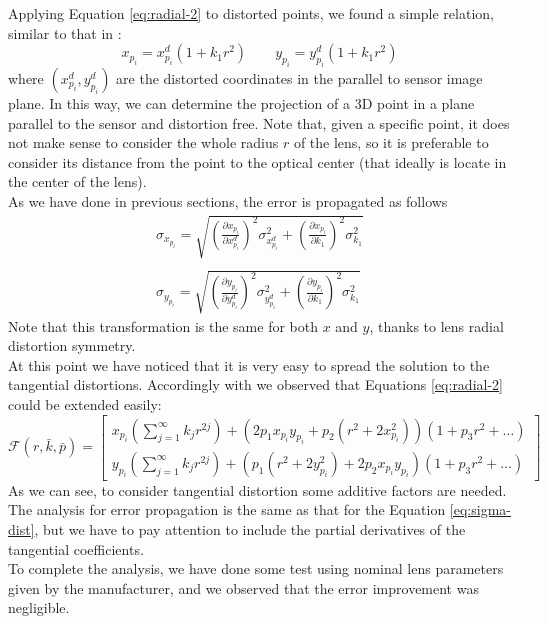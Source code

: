 Applying Equation \ref{eq:radial-2} to distorted points, we found a simple relation, similar to that in \cite{TsaiTvLenses}:
  \begin{equation}
    \label{eq:dist-coords}
    x_{p_i} = x_{p_i}^{d} \left( 1 + k_1r^2 \right) \qquad
    y_{p_i} = y_{p_i}^{d} \left( 1 + k_1r^2 \right)
  \end{equation}
where $\left( x_{p_i}^{d}, y_{p_i}^{d} \right)$ are the distorted coordinates in the parallel to sensor image plane. In this way, we can determine the projection of a 3D point in a plane parallel to the sensor and distortion free. Note that, given a specific point, it does not make sense to consider the whole radius $r$ of the lens, so it is preferable to consider its distance from the point to the optical center (that ideally is locate in the center of the lens). \\
As we have done in previous sections, the error is propagated as follows
  \begin{equation}
    \label{eq:sigma-dist}
    \begin{matrix}
      \sigma_{x_{p_i}} = \sqrt{
        \left( \frac{\partial x_{p_i}}{\partial x_{p_i}^d} \right)^2 \sigma_{x_{p_i}^d}^2
        + \left( \frac{\partial x_{p_i}}{\partial k_1} \right)^2 \sigma_{k_1}^2
      }
      \\~\\
      \sigma_{y_{p_i}} = \sqrt{
        \left( \frac{\partial y_{p_i}}{\partial y_{p_i}^d} \right)^2 \sigma_{y_{p_i}^d}^2
        + \left( \frac{\partial y_{p_i}}{\partial k_1} \right)^2 \sigma_{k_1}^2
      } 
    \end{matrix}
  \end{equation}
Note that this transformation is the same for both $x$ and $y$, thanks to lens radial distortion symmetry. \\

At this point we have noticed that it is very easy to spread the solution to the tangential distortions. Accordingly with \cite{Heikkila} we observed that Equations \ref{eq:radial-2} could be extended easily:
  \begin{equation*}
    \mathcal{F}\left( r, \bar{k}, \bar{p} \right) = 
    \begin{bmatrix}
      x_{p_i}\left( \sum_{j=1}^\infty k_jr^{2j} \right) + \left( 2 p_1 x_{p_i} y_{p_i} + p_2 \left( r^2 + 2 x_{p_i}^2  \right) \right) \left( 1 + p_3 r^2 + \ldots  \right)
      \\
      y_{p_i}\left( \sum_{j=1}^\infty k_jr^{2j} \right) + \left(  p_1 \left( r^2 + 2 y_{p_i}^2  \right) + 2 p_2 x_{p_i} y_{p_i} \right) \left( 1 + p_3 r^2 + \ldots \right)
    \end{bmatrix}
  \end{equation*}
As we can see, to consider tangential distortion some additive factors are needed. The analysis for error propagation is the same as that for the Equation \ref{eq:sigma-dist}, but we have to pay attention to include the partial derivatives of the tangential coefficients. \\
To complete the analysis, we have done some test using nominal lens parameters given by the manufacturer, and we observed that the error improvement was negligible. \\


